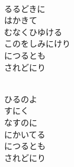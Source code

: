 \documentclass[10pt,b5j]{tarticle} %
\begin{document}
\begin{enumerate}
\begin{minipage}[c]{\blocksize}
    \end{minipage}
    \begin{minipage}[c]{\blocksize}
        
        \vspace{\linespace}
        \item~\\
        るるどきに\\
        はかきて\\
        むなくひゆける\\
        このをしみにけり\\
        につるとも\\
        されどにり
        
    \end{minipage}
    \begin{minipage}[c]{\blocksize}
        
        \vspace{\linespace}
        \item~\\
        ひるのよ\\
        すにく\\
        なすのに\\
        にかいてる\\
        につるとも\\
        されどにり
        
    \end{minipage}
    \begin{minipage}[c]{\blocksize}
        

\end{minipage}
\end{enumerate}
\end{document}
